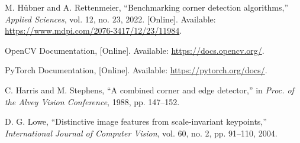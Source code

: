 \documentclass[journal]{IEEEtran}
\begin{document}
\begin{thebibliography}{1}

    M. Hübner and A. Rettenmeier, “Benchmarking corner detection algorithms,” \textit{Applied Sciences}, vol. 12, no. 23, 2022. [Online]. Available: \url{https://www.mdpi.com/2076-3417/12/23/11984}.

    OpenCV Documentation, [Online]. Available: \url{https://docs.opencv.org/}.

    PyTorch Documentation, [Online]. Available: \url{https://pytorch.org/docs/}.

    C. Harris and M. Stephens, “A combined corner and edge detector,” in \textit{Proc. of the Alvey Vision Conference}, 1988, pp. 147–152.

    D. G. Lowe, “Distinctive image features from scale-invariant keypoints,” \textit{International Journal of Computer Vision}, vol. 60, no. 2, pp. 91–110, 2004.

\end{thebibliography}
\end{document}
